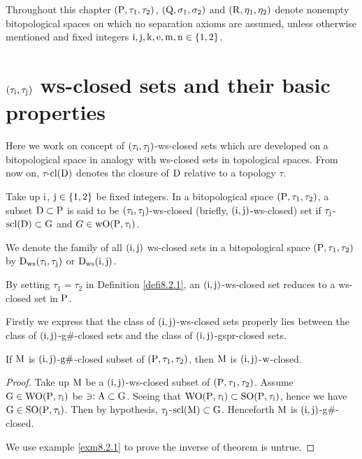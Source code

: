 Throughout this chapter $(\mathrm{P}, \tau_1, \tau_2)$, $(\mathrm{Q}, \sigma_{1}, \sigma_{2} )$ and $(\mathrm{R}, \eta_{1}, \eta_{2})$ denote nonempty bitopological spaces on which no separation axioms are assumed, unless otherwise mentioned and fixed integers $\mathrm{i}, \mathrm{j}, \mathrm{k}, \mathrm{e}, \mathrm{m}, \mathrm{n}\in \{1, 2\}$.

\section[$(\tau_{\TSi}, \tau_{\TSj})$ ws-closed sets and their basic properties]{\boldmath$(\tau_{\TSi}, \tau_{\TSj})$ ws-closed sets and their basic properties}\label{sec8.2}

Here we work on concept of $(\tau_{\TSi}, \tau_{\TSj})$-ws-closed sets which are developed on a bitopological space in analogy with ws-closed sets in topological spaces. From now on, $\tau$-$\mathrm{cl}(\mathrm{D})$ denotes the closure of $\mathrm{D}$ relative to a topology $\tau$.

\begin{dfn}\label{defi8.2.1}
Take up $\mathrm{i}$, $\mathrm{j} \in \{1, 2\}$ be fixed integers. In a bitopological space $(\mathrm{P}, \tau_1, \tau_2)$, a subset $\mathrm{D} \subset \mathrm{P}$ is said to be $(\tau_{\TSi}, \tau_{\TSj})$-ws-closed (briefly, $(\mathrm{i}, \mathrm{j})$-ws-closed) set if $\tau_{\mathrm{j}}$-$\mathrm{scl}(\mathrm{D}) \subset \mathrm{G}$ and $G \in \mathrm{w}\mathrm{O}(\mathrm{P}, \tau_{\mathrm{i}})$.
\end{dfn}

We denote the family of all $(\mathrm{i}, \mathrm{j})$ ws-closed sets in a bitopological space $(\mathrm{P}, \tau_1, \tau_2)$ by $\mathrm{D}_{\mathrm{ws}}(\tau_{\mathrm{i}}, \tau_{\mathrm{j}})$ or $\mathrm{D}_{\mathrm{ws}}(\mathrm{i}, \mathrm{j})$.

\begin{rem}\label{rem8.2.1}
By setting $\tau_1 = \tau_2$ in Definition \ref{defi8.2.1}, an $(\mathrm{i}, \mathrm{j})$-ws-closed set reduces to a ws-closed set in $\mathrm{P}$.
\end{rem}

Firstly we express that the class of $(\mathrm{i}, \mathrm{j})$-ws-closed sets properly lies between the class of $(\mathrm{i}, \mathrm{j})$-g\#-closed sets and the class of $(\mathrm{i}, \mathrm{j})$-gspr-closed sets.

\begin{thm}\label{thm8.2.1}
If $\mathrm{M}$ is $(\mathrm{i}, \mathrm{j})$-$\mathrm{g}\#$-closed subset of $(\mathrm{P}, \tau_1, \tau_2)$, then $\mathrm{M}$ is $(\mathrm{i}, \mathrm{j})$-$\mathrm{w}$-closed.
\end{thm}

\begin{proof}
Take up $\mathrm{M}$ be a $(\mathrm{i}, \mathrm{j})$-ws-closed subset of $(\mathrm{P}, \tau_1, \tau_2)$. Assume $\mathrm{G}\in \mathrm{W}\mathrm{O}(\mathrm{P}, \tau_{\mathrm{i}})$ be $\ni: \mathrm{A}\subset \mathrm{G}$. Seeing that $\mathrm{W}\mathrm{O}(\mathrm{P}, \tau_{\mathrm{i}}) \subset \mathrm{S}\mathrm{O}(\mathrm{P}, \tau_{\mathrm{i}})$, hence we have $\mathrm{G}\in\mathrm{S}\mathrm{O}(\mathrm{P}, \tau_{\mathrm{i}})$. Then by hypothesis, $\tau_{\mathrm{j}}$-$\mathrm{scl}(\mathrm{M}) \subset \mathrm{G}$. Henceforth $\mathrm{M}$ is $(\mathrm{i}, \mathrm{j})$-g\#-closed.

We use example \ref{exm8.2.1} to prove the inverse of theorem is untrue.
\end{proof}


